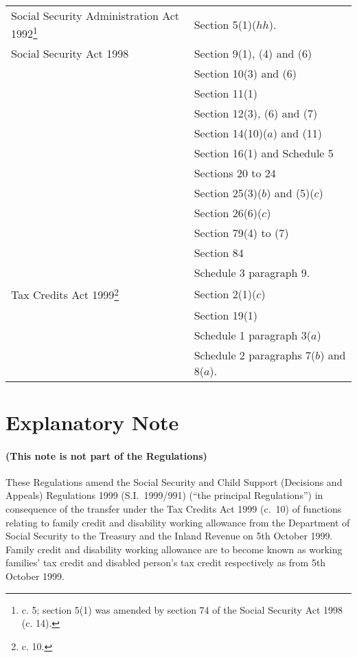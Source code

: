 \documentclass[12pt,a4paper]{article}
\begin{document}
{\footnotesize

\begin{longtable}{p{181.44629pt}p{162.9498pt}}
\hline
\endhead
\hline
\endlastfoot
Social Security Administration Act 1992\footnote{\frenchspacing 1992 c. 5; section 5(1) was amended by section 74 of the Social Security Act 1998 (c. 14).}	&Section 5(1)($hh$).\\
Social Security Act 1998	&Section 9(1), (4) and (6)\\
&	Section 10(3) and (6)\\
&	Section 11(1)\\
&	Section 12(3), (6) and (7)\\
&	Section 14(10)($a$)  and (11)\\
&	Section 16(1) and Schedule 5\\
&	Sections 20 to 24\\
&	Section 25(3)($b$)  and (5)($c$) \\
&	Section 26(6)($c$) \\
&	Section 79(4) to (7)\\
&	Section 84\\
&	Schedule 3 paragraph 9.\\
Tax Credits Act 1999\footnote{\frenchspacing 1999 c. 10.}	&Section 2(1)($c$) \\
&	Section 19(1)\\
&	Schedule 1 paragraph 3($a$) \\
&	Schedule 2 paragraphs 7($b$)  and 8($a$).\\
\end{longtable}

}

\part{Explanatory Note}

\renewcommand\parthead{— Explanatory Note}

\subsection*{(This note is not part of the Regulations)}

These Regulations amend the Social Security and Child Support (Decisions and Appeals) Regulations 1999 (S.I.\ 1999/991) (“the principal Regulations”) in consequence of the transfer under the Tax Credits Act 1999 (c.\ 10) of functions relating to family credit and disability working allowance from the Department of Social Security to the Treasury and the Inland Revenue on 5th October 1999. Family credit and disability working allowance are to become known as working families' tax credit and disabled person’s tax credit respectively as from 5th October 1999.
\end{document}
